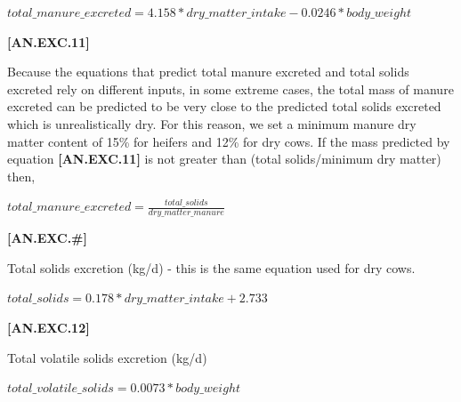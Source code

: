 \documentclass{article}
\begin{document}
\begin{refsection}
\begin{itemize}
    \begin{center}
        \(total\_manure\_excreted=4.158 * dry\_matter\_intake-0.0246 * body\_weight\)
    \end{center}
        \vspace{0.5cm} 
    
            {\raggedleft \textbf{[AN.EXC.11]}\par}
            \vspace{0.5cm} 


Because the equations that predict total manure excreted and total solids excreted rely on different inputs, in some extreme cases, the total mass of manure excreted can be predicted to be very close to the predicted total solids excreted which is unrealistically dry. For this reason, we set a minimum manure dry matter content of 15\% for heifers and 12\% for dry cows. If the mass predicted by equation \textbf{[AN.EXC.11]} is not greater than (total solids/minimum dry matter) then, 
        \vspace{0.5cm}
    
    \begin{center}
        \(total\_manure\_excreted= \frac{total\_solids}{dry\_matter\_manure}\)
    \end{center}
        \vspace{0.5cm} 
    
            {\raggedleft \textbf{[AN.EXC.\#]}\par}
            \vspace{0.5cm} 

Total solids excretion (kg/d) - this is the same equation used for dry cows.
        \vspace{0.5cm}
    
    \begin{center}
        \(total\_solids=0.178 * dry\_matter\_intake+2.733\)
    \end{center}
        \vspace{0.5cm} 
    
            {\raggedleft \textbf{[AN.EXC.12]}\par}
            \vspace{0.5cm} 

Total volatile solids excretion (kg/d)
        \vspace{0.5cm}
    
    \begin{center}
        \(total\_volatile\_solids=0.0073 * body\_weight\)
    \end{center}
        \vspace{0.5cm} 
    

\end{itemize}
\end{refsection}
\end{document}
